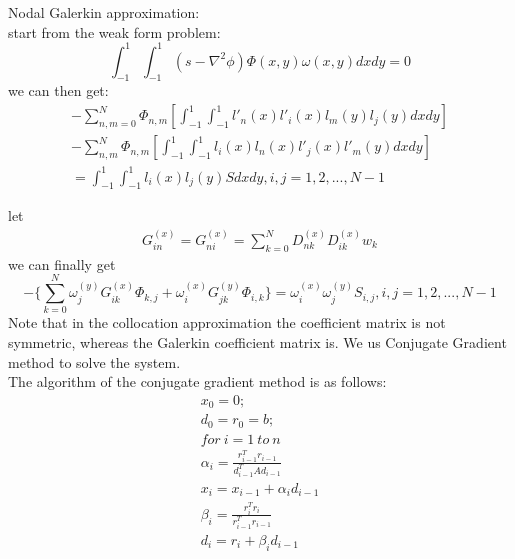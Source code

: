 \documentclass[12pt]{article}
\theoremstyle{plain}
\begin{document}
Nodal Galerkin approximation:\\
start from the  weak form problem:\\
\begin{equation}
\int_{-1}^{1}\int_{-1}^{1}(s-\nabla^2\phi )\Phi(x,y)\omega(x,y)dxdy=0
\end{equation}
we can then get:\\
\begin{equation}
\begin{split}
-\sum_{n,m=0}^N\Phi_{n,m}[\int_{-1}^{1}\int_{-1}^{1}l'_{n}(x)l'_{i}(x)l_m(y)l_j(y)dxdy]
\\
-\sum_{n,m}^{N}\Phi_{n,m}[\int_{-1}^{1}\int_{-1}^{1}l_i(x)l_n(x)l'_j(x)l'_m(y)dxdy]
\\
=\int_{-1}^{1}\int_{-1}^{1}l_i(x)l_j(y)Sdxdy, i,j =1,2,...,N-1
\end{split}
\end{equation}

let \\
\begin{equation}
\begin{split}
G_{in}^{(x)}=G_{ni}^{(x)}=\sum_{k=0}^{N}D_{nk}^{(x)}D_{ik}^{(x)}w_{k}
\end{split}
\end{equation}
we can finally get\\
\begin{equation}
-\{\sum_{k=0}^{N}\omega_j^{(y)}G_{ik}^{(x)}\Phi_{k,j}+\omega_i^{(x)}G_{jk}^{(y)}\Phi_{i,k}\}=\omega_i^{(x)}\omega_j^{(y)}S_{i,j}, i,j= 1,2,...,N-1
\end{equation}
Note that in the collocation approximation the coefficient matrix is not symmetric, whereas the Galerkin coefficient matrix is. We us Conjugate Gradient method to solve the system.
\\
The algorithm of the conjugate gradient method is as follows:\\

\begin{equation}
\begin{split}
x_0=0;\\
d_0=r_0=b;\\
for\ i =1\ to\ n\\
\alpha_{i}=\frac{r^{T}_{i-1}r_{i-1}}{d^T_{i-1}Ad_{i-1}}\\
x_{i}=x_{i-1}+\alpha_{i}d_{i-1}\\
\beta_{i}=\frac{r^T_ir_i}{r^{T}_{i-1}r_{i-1}}\\
d_{i}=r_{i}+\beta_{i}d_{i-1}
\end{split}
\end {equation}
\end{document}
